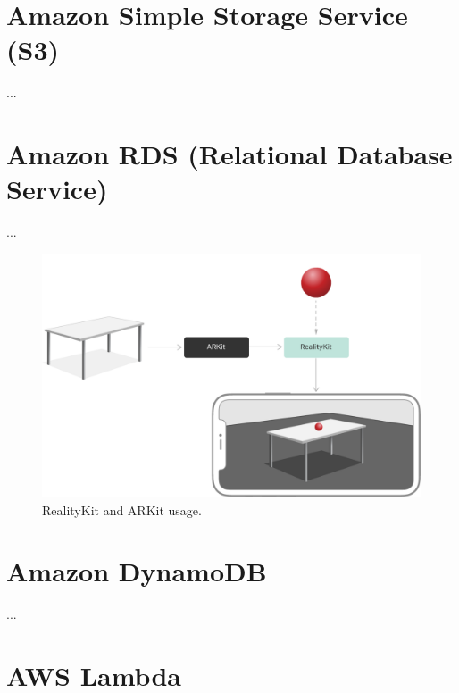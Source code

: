 \documentclass[11pt,a4paper,oneside]{report}
\begin{document}
\section{Amazon Simple Storage Service (S3)}

...


\section{Amazon RDS (Relational Database Service)}

...

\begin{figure}[!ht]
  \centering
  \includegraphics[width=\textwidth]{realitykit.png}
  \caption{RealityKit and ARKit usage.}
  \label{fig:TexnicCenter}
\end{figure}

\section{Amazon DynamoDB}

...

\section{AWS Lambda}
\end{document}
